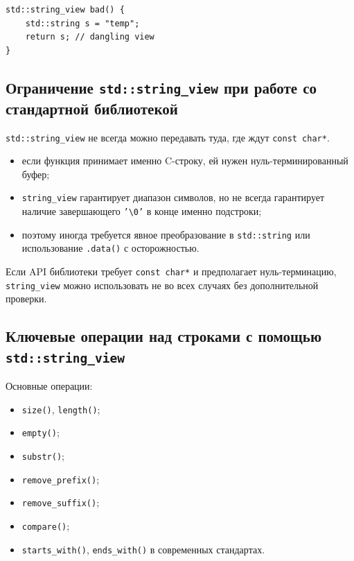 \begin{example}
\begin{verbatim}
std::string_view bad() {
    std::string s = "temp";
    return s; // dangling view
}
\end{verbatim}
\end{example}

\subsection{Ограничение \texttt{std::string\_view} при работе со стандартной библиотекой}
\texttt{std::string\_view} не всегда можно передавать туда, где ждут \texttt{const char*}.

\begin{itemize}
    \item если функция принимает именно C-строку, ей нужен нуль-терминированный буфер;
    \item \texttt{string\_view} гарантирует диапазон символов, но не всегда гарантирует наличие завершающего \texttt{'\textbackslash0'} в конце именно подстроки;
    \item поэтому иногда требуется явное преобразование в \texttt{std::string} или использование \texttt{.data()} с осторожностью.
\end{itemize}

\begin{remark}
Если API библиотеки требует \texttt{const char*} и предполагает нуль-терминацию, \texttt{string\_view} можно использовать не во всех случаях без дополнительной проверки.
\end{remark}

\subsection{Ключевые операции над строками с помощью \texttt{std::string\_view}}
Основные операции:
\begin{itemize}
    \item \texttt{size()}, \texttt{length()};
    \item \texttt{empty()};
    \item \texttt{substr()};
    \item \texttt{remove\_prefix()};
    \item \texttt{remove\_suffix()};
    \item \texttt{compare()};
    \item \texttt{starts\_with()}, \texttt{ends\_with()} в современных стандартах.
\end{itemize}

